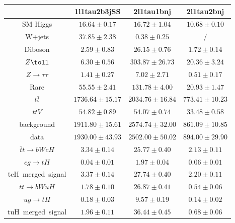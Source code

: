 \begin{tabular}{|c|c|c|c|} \hline
 & 1l1tau2b3jSS & 2l1tau1bnj & 2l1tau2bnj\\\hline
SM Higgs & $16.64\pm0.17$ & $16.72\pm1.04$ & $10.68\pm0.10$\\\hline
W+jets & $37.85\pm2.38$ & $0.38\pm0.25$ &  /\\\hline
Diboson & $2.59\pm0.83$ & $26.15\pm0.76$ & $1.72\pm0.14$\\\hline
$Z\toll$ & $6.30\pm0.56$ & $303.87\pm26.73$ & $20.36\pm3.24$\\\hline
$Z\to\tau\tau$ & $1.41\pm0.27$ & $7.02\pm2.71$ & $0.51\pm0.17$\\\hline
Rare & $55.55\pm2.41$ & $131.78\pm4.00$ & $20.93\pm1.47$\\\hline
$t\bar{t}$ & $1736.64\pm15.17$ & $2034.76\pm16.84$ & $773.41\pm10.23$\\\hline
$t\bar{t}V$ & $54.82\pm0.89$ & $54.07\pm0.74$ & $33.48\pm0.58$\\\hline
background & $1911.80\pm15.61$ & $2574.74\pm32.00$ & $861.09\pm10.85$\\\hline
data & $1930.00\pm43.93$ & $2502.00\pm50.02$ & $894.00\pm29.90$\\\hline
$\bar{t}t\to bWcH$ & $3.34\pm0.14$ & $25.77\pm0.40$ & $2.13\pm0.11$\\\hline
$cg\to tH$ & $0.04\pm0.01$ & $1.97\pm0.04$ & $0.06\pm0.01$\\\hline
tcH~merged~signal & $3.37\pm0.14$ & $27.74\pm0.40$ & $2.20\pm0.11$\\\hline
$\bar{t}t\to bWuH$ & $1.78\pm0.10$ & $26.87\pm0.41$ & $0.54\pm0.06$\\\hline
$ug\to tH$ & $0.18\pm0.03$ & $9.57\pm0.19$ & $0.14\pm0.02$\\\hline
tuH~merged~signal & $1.96\pm0.11$ & $36.44\pm0.45$ & $0.68\pm0.06$\\\hline
\end{tabular}
